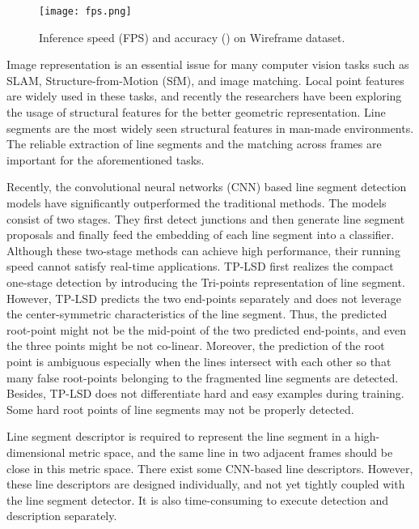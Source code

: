 \documentclass[10pt,twocolumn,letterpaper]{article}
\begin{document}
\begin{figure}[t]
\begin{center}
\texttt{[image: fps.png]}
\end{center}
   \caption{Inference speed (FPS) and accuracy () on Wireframe dataset.}
\label{FPS}
\end{figure}

Image representation is an essential issue for many computer vision tasks such as SLAM,  Structure-from-Motion (SfM), and image matching. Local point features \cite{superpoint,SIFT,orb} are widely used in these tasks, and recently the researchers have been exploring the usage of structural features for the better geometric representation\cite{plvio,planar_SLAM,RGB-D_SLAM_for_planar,Line_Correspondences,Line-Based_Map}. Line segments are the most widely seen structural features in man-made environments. The reliable extraction of line segments and the matching across frames are important for the aforementioned tasks.

Recently, the convolutional neural networks (CNN) based line segment detection models have significantly outperformed the traditional methods. The models\cite{HAWP,PPGNET,LCNN} consist of two stages.
They first detect junctions and then generate line segment proposals and finally feed the embedding of each line segment into a classifier. Although these two-stage methods can achieve high performance, their running speed cannot satisfy real-time applications. TP-LSD\cite{TP-LSD} first realizes the compact one-stage detection by introducing the Tri-points representation of line segment. However, TP-LSD predicts the two end-points separately and does not leverage the center-symmetric characteristics of the line segment. Thus, the predicted root-point might not be the mid-point of the two predicted end-points, and even the three points might be not co-linear. Moreover, the prediction of the root point is ambiguous especially when the lines intersect with each other so that many false root-points belonging to the fragmented line segments are detected.  Besides, TP-LSD does not differentiate hard and easy examples during training. Some hard root points of line segments may not be properly detected.  

Line segment descriptor is required to represent the line segment in a high-dimensional metric space, and the same line in two adjacent frames should be close in this metric space. There exist some CNN-based line descriptors\cite{WLD,DLD,LLD}. However, these line descriptors are designed individually, and not yet tightly coupled with the line segment detector. It is also time-consuming to execute detection and description separately. 
\end{document}
